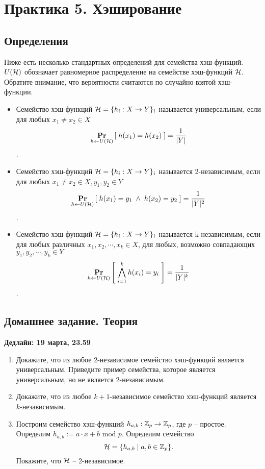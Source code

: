 \section{Практика 5. Хэширование}

\subsection{Определения}

Ниже есть несколько стандартных определений для семейства хэш-функций. $U(\mathcal{H})$ обозначает равномерное распределение на семействе хэш-функций $\mathcal{H}$. Обратите внимание, что вероятности считаются по случайно взятой хэш-функции.

\begin{itemize}
  \item  Семейство хэш-функций $\mathcal{H} = \{ h_i : X \rightarrow Y \}_i$ называется универсальным, если 
для любых $x_1 \neq x_2 \in X$ $$\underset{h \leftarrow U(\mathcal{H})}{\textbf{Pr}}\left[ \; h(x_1) = h(x_2) \; \right] = \frac{1}{|Y|}$$.

  \item  Семейство хэш-функций $\mathcal{H} = \{ h_i : X \rightarrow Y \}_i$ называется 2-независимым, если 
для любых $x_1 \neq x_2 \in X, y_1, y_2 \in Y$ $$\underset{h \leftarrow U(\mathcal{H})}{\textbf{Pr}}\left[ \; h(x_1) = y_1 \;\wedge\;h(x_2) = y_2 \; \right] = \frac{1}{|Y|^2}$$.

  \item  Семейство хэш-функций $\mathcal{H} = \{ h_i : X \rightarrow Y \}_i$ называется k-независимым, если 
для любых различных $x_1, x_2, \cdots, x_k \in X$, для любых, возможно совпадающих $y_1, y_2, \cdots, y_k \in Y$ $$\underset{h \leftarrow U(\mathcal{H})}{\textbf{Pr}}\left[ \; \bigwedge_{i=1}^k h(x_i) = y_i \; \right] = \frac{1}{|Y|^k}$$.
\end{itemize}

\subsection{Домашнее задание. Теория}
\textbf{Дедлайн: 19 марта, 23.59}

\begin{enumerate}

  \item Докажите, что из любое 2-независимое семейство хэш-функций является универсальным. Приведите пример семейства, которое является универсальным, но не является 2-независимым.

  \item Докажите, что из любое $k+1$-независимое семейство хэш-функций является $k$-независимым.

  \item Построим семейство хэш-функций $h_{a, b} : \mathbb{Z}_p \rightarrow \mathbb{Z}_p$, где $p$ -- простое.
  Определим $h_{a, b} := a \cdot x + b \text{ mod } p$. Определим семейство 
  $$\mathcal{H} = \{h_{a, b}\;|\; a, b \in \mathbb{Z}_p \}.$$
  Покажите, что $\mathcal{H}$ -- 2-независимое.

\end{enumerate}

